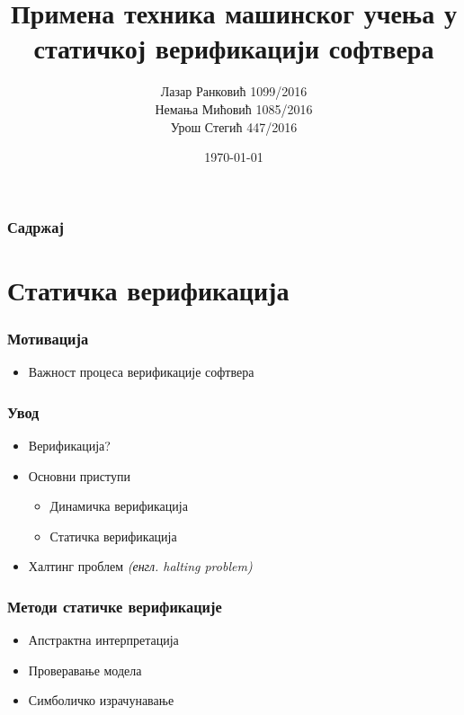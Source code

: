 \documentclass{beamer}
\title[Семинарски МСНР]{Примена техника машинског учења у статичкој верификацији софтвера}
\author{	Лазар Ранковић 1099/2016 \\
		Немања Мићовић 1085/2016 \\
		Урош Стегић 447/2016
}
\institute[МАТФ]{Математички факултет}
\date{\today}
\begin{document}
\begin{frame}
\titlepage
\end{frame}

\begin{frame}
\frametitle{Садржај}
\tableofcontents
\end{frame}


\section{Статичка верификација}

\begin{frame}
\frametitle{Мотивација}
\begin{itemize}
    \item Важност процеса верификације софтвера
\end{itemize}
\end{frame}
\begin{frame}
\frametitle{Увод}
\begin{itemize}
	\item Верификација?
 	\item Основни приступи
    \begin{itemize}
    \item Динамичка верификација
    \item Статичка верификација
    \end{itemize}
 	\item Халтинг проблем \emph{(енгл. halting problem)}
\end{itemize}
\end{frame}
\begin{frame}
\frametitle{Методи статичке верификације}
\begin{itemize}
	\item Апстрактна интерпретација
 	\item Проверавање модела
 	\item Симболичко израчунавање
\end{itemize}
\end{frame}
\end{document}
